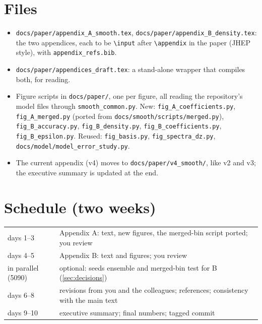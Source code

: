 \documentclass[11pt]{article}
\newcommand{\file}[1]{\nolinkurl{#1}}
\newcommand{\code}[1]{\texttt{#1}}
\begin{document}
\section{Files}

\begin{itemize}
  \item \file{docs/paper/appendix_A_smooth.tex}, \file{docs/paper/appendix_B_density.tex}: the two appendices,
    each to be \code{\textbackslash input} after \code{\textbackslash appendix} in the paper (JHEP style),
    with \file{appendix_refs.bib}.
  \item \file{docs/paper/appendices_draft.tex}: a stand-alone wrapper that compiles both, for reading.
  \item Figure scripts in \file{docs/paper/}, one per figure, all reading the repository's model files through
    \file{smooth_common.py}. New: \file{fig_A_coefficients.py}, \file{fig_A_merged.py} (ported from
    \file{docs/smooth/scripts/merged.py}), \file{fig_B_accuracy.py}, \file{fig_B_density.py},
    \file{fig_B_coefficients.py}, \file{fig_B_epsilon.py}. Reused: \file{fig_basis.py},
    \file{fig_spectra_dz.py}, \file{docs/model/model_error_study.py}.
  \item The current appendix (v4) moves to \file{docs/paper/v4_smooth/}, like v2 and v3; the executive summary
    is updated at the end.
\end{itemize}

\section{Schedule (two weeks)}

\begin{center}
\small
\begin{tabular}{ll}
\toprule
days 1--3 & Appendix A: text, new figures, the merged-bin script ported; you review \\
days 4--5 & Appendix B: text and figures; you review \\
in parallel (5090) & optional: seeds ensemble and merged-bin test for B (\cref{sec:decisions}) \\
days 6--8 & revisions from you and the colleagues; references; consistency with the main text \\
days 9--10 & executive summary; final numbers; tagged commit \\
\bottomrule
\end{tabular}
\end{center}
\end{document}
